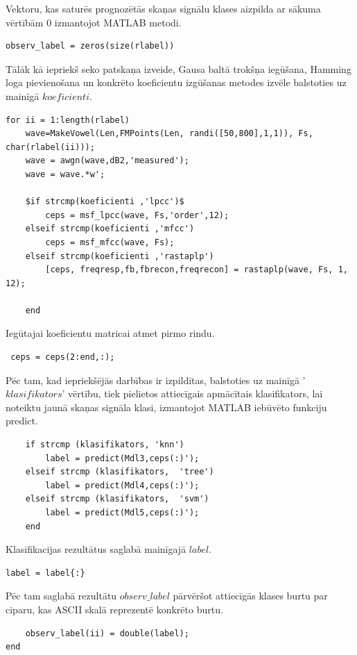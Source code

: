 \documentclass[12pt,paper=A4]{report}
\begin{document}
Vektoru, kas saturēs prognozētās skaņas signālu klases aizpilda ar sākuma vērtībām 0 izmantojot MATLAB metodi. 
\begin{lstlisting}
observ_label = zeros(size(rlabel))
\end{lstlisting}

Tālāk kā iepriekš seko patskaņa izveide, Gausa baltā trokšņa iegūšana, Hamming loga pievienošana un konkrēto koeficientu izgūšanas metodes izvēle balstoties uz mainīgā $koeficienti$. 
\begin{lstlisting}
for ii = 1:length(rlabel)
    wave=MakeVowel(Len,FMPoints(Len, randi([50,800],1,1)), Fs, char(rlabel(ii)));
    wave = awgn(wave,dB2,'measured');
    wave = wave.*w';
  
    $if strcmp(koeficienti ,'lpcc')$
        ceps = msf_lpcc(wave, Fs,'order',12);
    elseif strcmp(koeficienti ,'mfcc')
        ceps = msf_mfcc(wave, Fs);
    elseif strcmp(koeficienti ,'rastaplp')
        [ceps, freqresp,fb,fbrecon,freqrecon] = rastaplp(wave, Fs, 1, 12);

    end
\end{lstlisting}



Iegūtajai koeficientu matricai atmet pirmo rindu.
\begin{lstlisting}
 ceps = ceps(2:end,:);
\end{lstlisting}


    Pēc tam, kad iepriekšējās darbības ir izpildītas, balstoties uz mainīgā '$klasifikators$' vērtību, tiek pielietos attiecīgais apmācītais klasifikators, lai noteiktu jaunā skaņas signāla klasi, izmantojot MATLAB iebūvēto funkciju predict.
\begin{lstlisting}
    if strcmp (klasifikators, 'knn')
        label = predict(Mdl3,ceps(:)');
    elseif strcmp (klasifikators,  'tree')
        label = predict(Mdl4,ceps(:)');
    elseif strcmp (klasifikators,  'svm')
        label = predict(Mdl5,ceps(:)'); 
    end
\end{lstlisting}
    
    
Klasifikacijas rezultātus saglabā mainīgajā $label$.    
\begin{lstlisting}
label = label{:}
\end{lstlisting}

Pēc tam saglabā rezultātu $observ\_label$ pārvēršot attiecīgās klases burtu par ciparu, kas ASCII skalā reprezentē konkrēto burtu.
\begin{lstlisting}
    observ_label(ii) = double(label);
end
\end{lstlisting}
\end{document}
